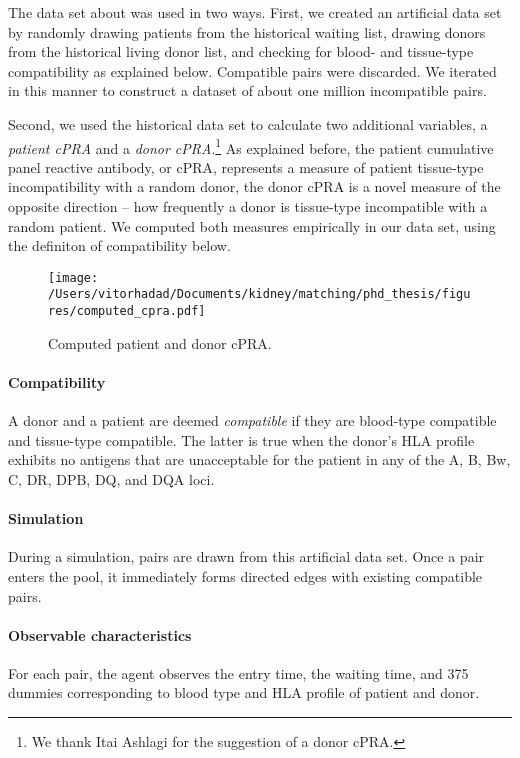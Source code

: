 \documentclass[12pt]{article}
\begin{document}
The data set about was used in two ways. First, we created an artificial data set by randomly drawing patients from the historical waiting list, drawing donors from the historical living donor list, and checking for blood- and tissue-type compatibility as explained below. Compatible pairs were discarded. We iterated in this manner to construct a dataset of about one million incompatible pairs.

Second, we  used the historical data set to calculate two additional variables, a \emph{patient cPRA} and  a \emph{donor cPRA}.\footnote{We thank Itai Ashlagi for the suggestion of a donor cPRA.} As explained before, the patient cumulative panel reactive antibody, or cPRA, represents a measure of patient tissue-type incompatibility with a random donor, the donor cPRA is a novel measure of the opposite direction -- how frequently a donor is tissue-type incompatible with a random patient. We computed both measures empirically in our data set, using the definiton of compatibility below.

\begin{figure}
\centering
\texttt{[image: /Users/vitorhadad/Documents/kidney/matching/phd\_thesis/figures/computed\_cpra.pdf]}
\caption{Computed patient and donor cPRA.}
\label{fig:cpra}
\end{figure}



\paragraph{Compatibility} A donor and a patient are deemed \emph{compatible} if they are blood-type compatible and tissue-type compatible. The latter is true             when the donor's HLA profile exhibits no antigens that are unacceptable for the patient in any of the A, B, Bw, C, DR, DPB, DQ, and DQA loci.

\paragraph{Simulation} During a simulation, pairs are drawn from this artificial data set. Once a pair enters the pool, it immediately forms directed edges with existing compatible pairs.

\paragraph{Observable characteristics} For each pair, the agent observes the entry time, the waiting time, and 375 dummies corresponding to blood type and HLA profile of patient and donor. 
\end{document}
